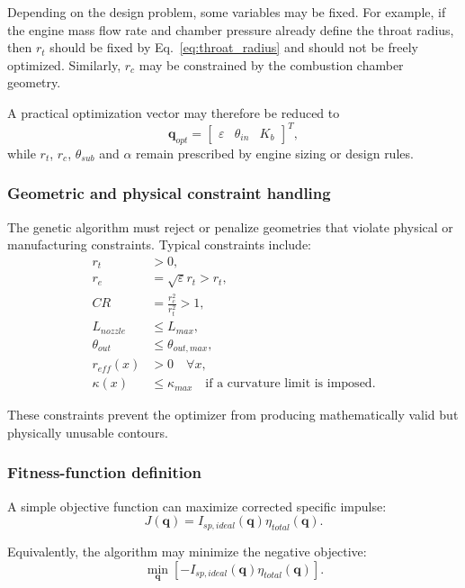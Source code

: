 \documentclass[11pt,a4paper]{article}
\begin{document}
Depending on the design problem, some variables may be fixed. For example, if the engine mass flow rate and chamber pressure already define the throat radius, then $r_t$ should be fixed by Eq.~\eqref{eq:throat_radius} and should not be freely optimized. Similarly, $r_c$ may be constrained by the combustion chamber geometry.

A practical optimization vector may therefore be reduced to
\begin{equation}
\bm{q}_{opt}=\begin{bmatrix}
\varepsilon & \theta_{in} & K_b
\end{bmatrix}^T,
\label{eq:chromosome_reduced}
\end{equation}
while $r_t$, $r_c$, $\theta_{sub}$ and $\alpha$ remain prescribed by engine sizing or design rules.

\subsubsection{Geometric and physical constraint handling}

The genetic algorithm must reject or penalize geometries that violate physical or manufacturing constraints. Typical constraints include:
\begin{align}
r_t &>0,\\
r_e &=\sqrt{\varepsilon}r_t>r_t,\\
CR &=\frac{r_c^2}{r_t^2}>1,\\
L_{nozzle} &\leq L_{max},\\
\theta_{out} &\leq \theta_{out,max},\\
r_{eff}(x)&>0 \quad \forall x,\\
\kappa(x)&\leq \kappa_{max} \quad \text{if a curvature limit is imposed.}
\end{align}

These constraints prevent the optimizer from producing mathematically valid but physically unusable contours.

\subsubsection{Fitness-function definition}

A simple objective function can maximize corrected specific impulse:
\begin{equation}
J(\bm{q})=I_{sp,ideal}(\bm{q})\eta_{total}(\bm{q}).
\label{eq:objective_Isp}
\end{equation}

Equivalently, the algorithm may minimize the negative objective:
\begin{equation}
\min_{\bm{q}}\left[-I_{sp,ideal}(\bm{q})\eta_{total}(\bm{q})\right].
\end{equation}
\end{document}
